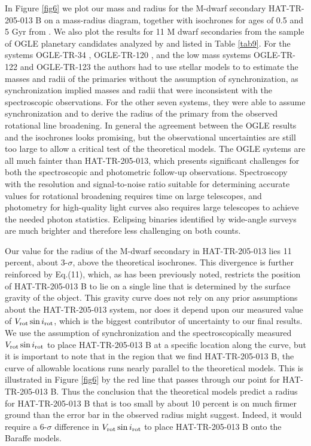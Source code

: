 \documentclass[12pt, preprint]{aastex}
\begin{document}
In Figure \ref{fig6} we plot our mass and radius for the M-dwarf secondary HAT-TR-205-013 B on a mass-radius diagram, together with isochrones for ages of 0.5 and 5 Gyr from \cite{baraffe1998}. We also plot the results for 11 M dwarf secondaries from the sample of OGLE planetary candidates analyzed by \citet{bouchy2005,pont2005a,pont2005b,pont2006} and listed in Table \ref{tab9}. For the systems OGLE-TR-34 \citep{bouchy2005}, OGLE-TR-120 \citep{pont2005b}, and the low mass systems OGLE-TR-122 \citep{pont2005a} and OGLE-TR-123 \citep{pont2006} the authors had to use stellar models to to estimate the masses and radii of the primaries without the assumption of synchronization, as synchronization implied masses and radii that were inconsistent with the spectroscopic observations. For the other seven systems, they were able to assume synchronization and to derive the radius of the primary from the observed rotational line broadening. In general the agreement between the OGLE results and the \citet{baraffe1998} isochrones looks promising, but the observational uncertainties are still too large to allow a critical test of the theoretical models. The OGLE systems are all much fainter than HAT-TR-205-013, which presents significant challenges for both the spectroscopic and photometric follow-up observations. Spectroscopy with the resolution and signal-to-noise ratio suitable for determining accurate values for rotational broadening requires time on large telescopes, and photometry for high-quality light curves also requires large telescopes to achieve the needed photon statistics. Eclipsing binaries identified by wide-angle surveys are much brighter and therefore less challenging on both counts.

Our value for the radius of the M-dwarf secondary in HAT-TR-205-013 lies 11 percent, about 3-$\sigma$, above the theoretical isochrones. This divergence is further reinforced by Eq.(11), which, as has been previously noted, restricts the position of HAT-TR-205-013 B to lie on a single line that is determined by the surface gravity of the object. This gravity curve does not rely on any prior assumptions about the HAT-TR-205-013 system, nor does it depend upon our measured value of $V_{\rm rot} \sin i_{\rm rot}$, which is the biggest contributor of uncertainty to our final results. We use the assumption of synchronization and the spectroscopically measured $V_{\rm rot} \sin i_{\rm rot}$ to place HAT-TR-205-013 B at a specific location along the curve, but it is important to note that in the region that we find HAT-TR-205-013 B, the curve of allowable locations runs nearly parallel to the theoretical models. This is illustrated in Figure \ref{fig6} by the red line that passes through our point for HAT-TR-205-013 B. Thus the conclusion that the theoretical models predict a radius for HAT-TR-205-013 B that is too small by about 10 percent is on much firmer ground than the error bar in the observed radius might suggest. Indeed, it would require a 6-$\sigma$ difference in $V_{\rm rot} \sin i_{\rm rot}$ to place HAT-TR-205-013 B onto the Baraffe models. 
\end{document}
